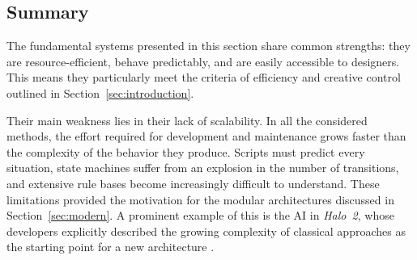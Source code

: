 \subsection{Summary}

The fundamental systems presented in this section share common strengths: they are resource-efficient, behave predictably, and are easily accessible to designers. This means they particularly meet the criteria of efficiency and creative control outlined in Section~\ref{sec:introduction}.

Their main weakness lies in their lack of scalability. In all the considered methods, the effort required for development and maintenance grows faster than the complexity of the behavior they produce. Scripts must predict every situation, state machines suffer from an explosion in the number of transitions, and extensive rule bases become increasingly difficult to understand. These limitations provided the motivation for the modular architectures discussed in Section~\ref{sec:modern}. A prominent example of this is the AI in \emph{Halo~2}, whose developers explicitly described the growing complexity of classical approaches as the starting point for a new architecture \cite{isla2005}.
